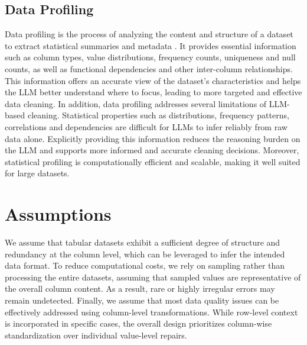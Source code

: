 \subsection{Data Profiling}
Data profiling is the process of analyzing the content and structure of a dataset to extract statistical summaries and metadata \cite{PRDS}. 
It provides essential information such as column types, value distributions, frequency counts, uniqueness and null counts, as well as functional dependencies and other inter-column relationships. 
This information offers an accurate view of the dataset's characteristics and helps the LLM better understand where to focus, leading to more targeted and effective data cleaning.
In addition, data profiling addresses several limitations of LLM-based cleaning.
Statistical properties such as distributions, frequency patterns, correlations and dependencies are difficult for LLMs to infer reliably from raw data alone. 
Explicitly providing this information reduces the reasoning burden on the LLM and supports more informed and accurate cleaning decisions. 
Moreover, statistical profiling is computationally efficient and scalable, making it well suited for large datasets.

\section{Assumptions}
We assume that tabular datasets exhibit a sufficient degree of structure and redundancy at the column level, which can be leveraged to infer the intended data format. 
To reduce computational costs, we rely on sampling rather than processing the entire datasets, assuming that sampled values are representative of the overall column content. 
As a result, rare or highly irregular errors may remain undetected.
Finally, we assume that most data quality issues can be effectively addressed using column-level transformations. 
While row-level context is incorporated in specific cases, the overall design prioritizes column-wise standardization over individual value-level repairs.